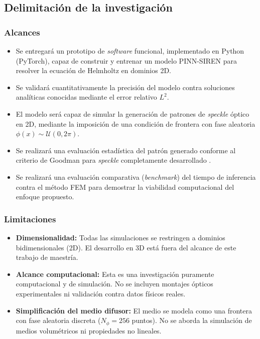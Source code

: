 \subsection{Delimitación de la investigación}

\subsubsection*{Alcances}
\begin{itemize}
    \item Se entregará un prototipo de \textit{software} funcional, implementado
    en Python (PyTorch), capaz de construir y entrenar un modelo PINN-SIREN para
    resolver la ecuación de Helmholtz en dominios 2D.

    \item Se validará cuantitativamente la precisión del modelo contra soluciones
    analíticas conocidas mediante el error relativo $L^2$.

    \item El modelo será capaz de simular la generación de patrones de
    \textit{speckle} óptico en 2D, mediante la imposición de una condición de
    frontera con fase aleatoria $\phi(x) \sim \mathcal{U}(0, 2\pi)$.

    \item Se realizará una evaluación estadística del patrón generado conforme
    al criterio de Goodman para \textit{speckle} completamente desarrollado
    \parencite{goodman2007speckle}.

    \item Se realizará una evaluación comparativa (\textit{benchmark}) del tiempo
    de inferencia contra el método FEM para demostrar la viabilidad computacional
    del enfoque propuesto.
\end{itemize}

\subsubsection*{Limitaciones}
\begin{itemize}
    \item \textbf{Dimensionalidad:} Todas las simulaciones se restringen a
    dominios bidimensionales (2D). El desarrollo en 3D está fuera del alcance
    de este trabajo de maestría.

    \item \textbf{Alcance computacional:} Esta es una investigación puramente
    computacional y de simulación. No se incluyen montajes ópticos experimentales
    ni validación contra datos físicos reales.

    \item \textbf{Simplificación del medio difusor:} El medio se modela como
    una frontera con fase aleatoria discreta ($N_\phi = 256$ puntos). No se
    aborda la simulación de medios volumétricos ni propiedades no lineales.
\end{itemize}

